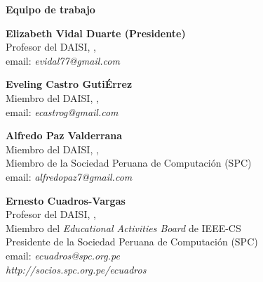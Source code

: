 \begin{center}
\textbf{\Huge Equipo de trabajo}
\end{center}
\vspace{1cm}

\begin{center}
\textbf{Elizabeth Vidal Duarte (Presidente)}\\
Profesor del DAISI, \University, \city\\
email: \textit{evidal77@gmail.com}
\end{center}

\begin{center}
\textbf{Eveling Castro GutiÉrrez}\\
Miembro del DAISI, \University, \city\\
email: \textit{ecastrog@gmail.com}
\end{center}

\begin{center}
\textbf{Alfredo Paz Valderrana}\\
Miembro del DAISI, \University, \city\\
Miembro de la Sociedad Peruana de Computación (SPC)\\
email: \textit{alfredopaz7@gmail.com}
\end{center}

\begin{center}
\textbf{Ernesto Cuadros-Vargas}\\
Profesor del DAISI, \University, \city\\
Miembro del \textit{Educational Activities Board} de IEEE-CS\\
Presidente de la Sociedad Peruana de Computación (SPC)\\
email: \textit{ecuadros@spc.org.pe}\\
\textit{http://socios.spc.org.pe/ecuadros}
\end{center}




